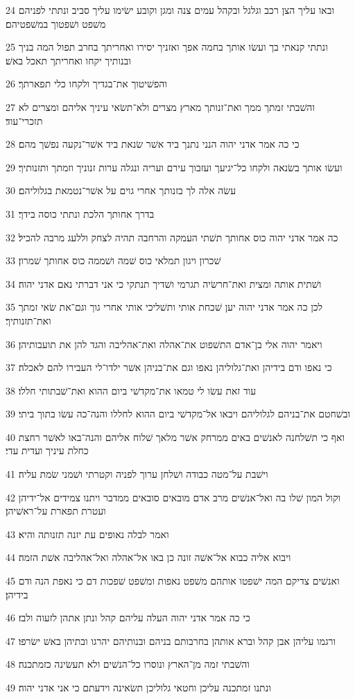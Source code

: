 \par 24 ובאו עליך הצן רכב וגלגל ובקהל עמים צנה ומגן וקובע ישׂימו עליך סביב ונתתי לפניהם משׁפט ושׁפטוך במשׁפטיהם׃
\par 25 ונתתי קנאתי בך ועשׂו אותך בחמה אפך ואזניך יסירו ואחריתך בחרב תפול המה בניך ובנותיך יקחו ואחריתך תאכל באשׁ׃
\par 26 והפשׁיטוך את־בגדיך ולקחו כלי תפארתך׃
\par 27 והשׁבתי זמתך ממך ואת־זנותך מארץ מצרים ולא־תשׂאי עיניך אליהם ומצרים לא תזכרי־עוד׃
\par 28 כי כה אמר אדני יהוה הנני נתנך ביד אשׁר שׂנאת ביד אשׁר־נקעה נפשׁך מהם׃
\par 29 ועשׂו אותך בשׂנאה ולקחו כל־יגיעך ועזבוך עירם ועריה ונגלה ערות זנוניך וזמתך ותזנותיך׃
\par 30 עשׂה אלה לך בזנותך אחרי גוים על אשׁר־נטמאת בגלוליהם׃
\par 31 בדרך אחותך הלכת ונתתי כוסה בידך׃
\par 32 כה אמר אדני יהוה כוס אחותך תשׁתי העמקה והרחבה תהיה לצחק וללעג מרבה להכיל׃
\par 33 שׁכרון ויגון תמלאי כוס שׁמה ושׁממה כוס אחותך שׁמרון׃
\par 34 ושׁתית אותה ומצית ואת־חרשׂיה תגרמי ושׁדיך תנתקי כי אני דברתי נאם אדני יהוה׃
\par 35 לכן כה אמר אדני יהוה יען שׁכחת אותי ותשׁליכי אותי אחרי גוך וגם־את שׂאי זמתך ואת־תזנותיך׃
\par 36 ויאמר יהוה אלי בן־אדם התשׁפוט את־אהלה ואת־אהליבה והגד להן את תועבותיהן׃
\par 37 כי נאפו ודם בידיהן ואת־גלוליהן נאפו וגם את־בניהן אשׁר ילדו־לי העבירו להם לאכלה׃
\par 38 עוד זאת עשׂו לי טמאו את־מקדשׁי ביום ההוא ואת־שׁבתותי חללו׃
\par 39 ובשׁחטם את־בניהם לגלוליהם ויבאו אל־מקדשׁי ביום ההוא לחללו והנה־כה עשׂו בתוך ביתי׃
\par 40 ואף כי תשׁלחנה לאנשׁים באים ממרחק אשׁר מלאך שׁלוח אליהם והנה־באו לאשׁר רחצת כחלת עיניך ועדית עדי׃
\par 41 וישׁבת על־מטה כבודה ושׁלחן ערוך לפניה וקטרתי ושׁמני שׂמת עליה׃
\par 42 וקול המון שׁלו בה ואל־אנשׁים מרב אדם מובאים סובאים ממדבר ויתנו צמידים אל־ידיהן ועטרת תפארת על־ראשׁיהן׃
\par 43 ואמר לבלה נאופים עת יזנה תזנותה והיא׃
\par 44 ויבוא אליה כבוא אל־אשׁה זונה כן באו אל־אהלה ואל־אהליבה אשׁת הזמה׃
\par 45 ואנשׁים צדיקם המה ישׁפטו אותהם משׁפט נאפות ומשׁפט שׁפכות דם כי נאפת הנה ודם בידיהן׃
\par 46 כי כה אמר אדני יהוה העלה עליהם קהל ונתן אתהן לזעוה ולבז׃
\par 47 ורגמו עליהן אבן קהל וברא אותהן בחרבותם בניהם ובנותיהם יהרגו ובתיהן באשׁ ישׂרפו׃
\par 48 והשׁבתי זמה מן־הארץ ונוסרו כל־הנשׁים ולא תעשׂינה כזמתכנה׃
\par 49 ונתנו זמתכנה עליכן וחטאי גלוליכן תשׂאינה וידעתם כי אני אדני יהוה׃

